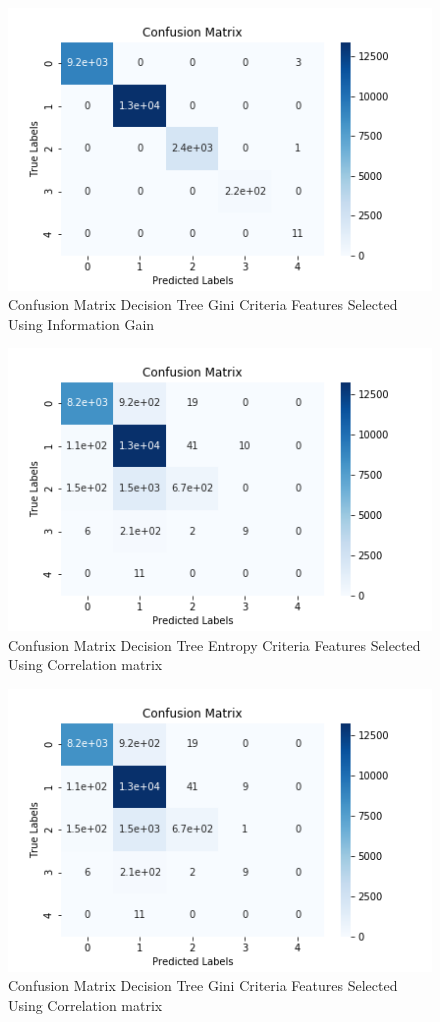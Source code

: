 \documentclass{article}
\begin{document}
\begin{figure}[htbp]
\centering
\includegraphics[scale=0.5]{figures/cm_dt_ig_gini.png}
\caption{Confusion Matrix Decision Tree Gini Criteria Features Selected Using Information Gain}
\label{fig:dt_cm_gini_ig}
\end{figure}

\begin{figure}[htbp]
\centering
\includegraphics[scale=0.5]{figures/cm_dt_corr_entropy.png}
\caption{Confusion Matrix Decision Tree Entropy Criteria Features Selected Using Correlation matrix}
\label{fig:dt_cm_gini_corr}
\end{figure}

\begin{figure}[htbp]
\centering
\includegraphics[scale=0.5]{figures/cm_dt_corr_gini.png}
\caption{Confusion Matrix Decision Tree Gini Criteria Features Selected Using Correlation matrix}
\label{fig:dt_cm_gini_corr}
\end{figure}
\end{document}
